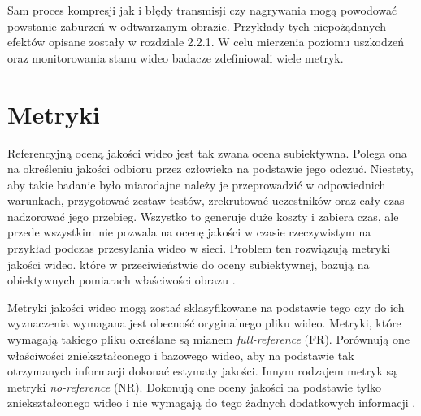 Sam proces kompresji jak i błędy transmisji czy nagrywania mogą powodować powstanie zaburzeń w odtwarzanym obrazie. Przykłady tych niepożądanych efektów opisane zostały w rozdziale 2.2.1. W celu mierzenia poziomu uszkodzeń oraz monitorowania stanu wideo badacze zdefiniowali wiele metryk.\par 


\section{Metryki}

Referencyjną oceną jakości wideo jest tak zwana ocena subiektywna. Polega ona na określeniu jakości odbioru przez człowieka na podstawie jego odczuć. Niestety, aby takie badanie było miarodajne należy je przeprowadzić w odpowiednich warunkach, przygotować zestaw testów, zrekrutować uczestników oraz cały czas nadzorować jego przebieg. Wszystko to generuje duże koszty i zabiera czas, ale przede wszystkim nie pozwala na ocenę jakości w czasie rzeczywistym na przykład podczas przesyłania wideo w sieci. Problem ten rozwiązują metryki jakości wideo. które w przeciwieństwie do oceny subiektywnej, bazują na obiektywnych pomiarach właściwości obrazu \cite{vqm}.\par

Metryki jakości wideo mogą zostać sklasyfikowane na podstawie tego czy do ich wyznaczenia wymagana jest obecność oryginalnego pliku wideo. Metryki, które wymagają takiego pliku określane są mianem {\em  full-reference} (FR). Porównują one właściwości zniekształconego i bazowego wideo, aby na podstawie tak otrzymanych informacji dokonać estymaty jakości. Innym rodzajem metryk są metryki {\em no-reference} (NR). Dokonują one oceny jakości na podstawie tylko zniekształconego wideo i nie wymagają do tego żadnych dodatkowych informacji \cite{vqm}.\par



